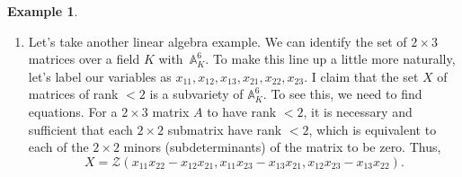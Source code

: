 \documentclass{amsart}[12pt]
\newcommand{\A}{\mathbb{A}}
\newcommand{\cZ}{\mathcal{Z}}
\numberwithin{equation}{section}
\theoremstyle{plain} %
\theoremstyle{definition}
\newtheorem{ex}[equation]{Example}
\theoremstyle{remark}
\begin{document}
\begin{ex}
\begin{enumerate}
\item Let's take another linear algebra example. We can identify the set of $2 \times 3$ matrices over a field $K$ with~$\A^6_K$. To make this line up a little more naturally, let's label our variables as $x_{11}, x_{12}, x_{13}, x_{21}, x_{22}, x_{23}$. I claim that the set $X$ of matrices of rank $<2$ is a subvariety of $\A^{6}_K$. To see this, we need to find equations. For a $2\times 3$ matrix $A$ to have rank $<2$, it is necessary and sufficient that each $2\times 2$ submatrix have rank $<2$, which is equivalent to each of the $2\times 2$ minors (subdeterminants) of the matrix to be zero. Thus, 
\[ X = \cZ( x_{11} x_{22} - x_{12} x_{21} , x_{11} x_{23} - x_{13} x_{21} , x_{12} x_{23} - x_{13} x_{22} ).\]

\end{enumerate}
\end{ex}
\end{document}

